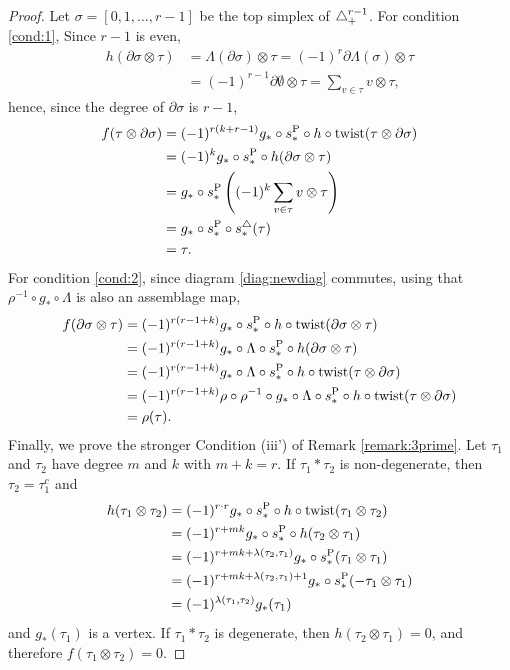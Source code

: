 \begin{proof}
	Let $\sigma = [0,1,\ldots,r-1]$ be the top simplex of $\triangle_{+}^{r-1}$. For condition \eqref{cond:1},  Since $r-1$ is even,
	\begin{align*}
		h(\partial\sigma\otimes \tau) &= \Lambda(\partial \sigma)\otimes \tau = (-1)^{r}\partial \Lambda(\sigma)\otimes\tau
		\\&= (-1)^{r-1}\partial\emptyset\otimes\tau = \sum_{v\in \tau} v\otimes\tau,
	\end{align*}
	hence, since the degree of $\partial \sigma$ is $r-1$,
	\begin{align*}
		f(\tau\otimes \partial\sigma)
		&=(-1)^{r(k+r-1)} g_*\circ s_*^{\operatorname{P}}\circ h \circ \mathrm{twist}(\tau\otimes \partial\sigma)\\
		&= (-1)^{k} g_*\circ s_*^{\operatorname{P}}\circ h (\partial\sigma\otimes \tau)\\
		&= g_*\circ s_*^{\operatorname{P}}\left((-1)^k\sum_{v\in \tau} v\otimes\tau\right) \\
		&= g_*\circ s_*^{\operatorname{P}}\circ s_*^{\triangle}(\tau) \\
		&= \tau.
	\end{align*}
	For condition \eqref{cond:2}, since diagram \eqref{diag:newdiag} commutes, using that $\rho^{-1}\circ g_*\circ \Lambda$ is also an assemblage map,
	\begin{align*}
		f(\partial\sigma\otimes \tau)
		&= (-1)^{r(r-1+k)}g_*\circ s_*^{\operatorname{P}}\circ h \circ \mathrm{twist}(\partial\sigma\otimes \tau)
		\\
		&= (-1)^{r(r-1+k)} g_*\circ \Lambda\circ s_*^{\operatorname{P}}\circ h (\partial \sigma \otimes \tau)
		\\
		&= (-1)^{r(r-1+k)} g_*\circ \Lambda\circ s_*^{\operatorname{P}}\circ h \circ \mathrm{twist}(\tau\otimes \partial\sigma)
		\\
		&= (-1)^{r(r-1+k)}\rho\circ \rho^{-1} \circ g_*\circ \Lambda\circ s_*^{\operatorname{P}}\circ h \circ \mathrm{twist}(\tau\otimes \partial\sigma)
		\\
		&= \rho(\tau).
	\end{align*}
	Finally, we prove the stronger Condition (iii') of Remark \ref{remark:3prime}. Let $\tau_1$ and $\tau_2$ have degree $m$ and $k$ with $m+k=r$. If $\tau_1*\tau_2$ is non-degenerate, then $\tau_2 = \tau_1^c$ and
	\begin{align*}
		h(\tau_1\otimes \tau_2)
		&= (-1)^{r\cdot r} g_*\circ s_*^{\operatorname{P}}\circ h\circ \operatorname{twist}(\tau_1\otimes \tau_2)
		\\
		&= (-1)^{r + mk} g_*\circ s_*^{\operatorname{P}}\circ h(\tau_2\otimes \tau_1)
		\\
		&= (-1)^{r + mk + \lambda(\tau_2,\tau_1)} g_*\circ s_*^{\operatorname{P}}(\tau_1\otimes \tau_1)
		\\
		&= (-1)^{r + mk + \lambda(\tau_2,\tau_1) + 1} g_*\circ s_*^{\operatorname{P}}(-\tau_1\otimes \tau_1)
		\\
		&= (-1)^{\lambda(\tau_1,\tau_2)} g_*(\tau_1)
	\end{align*}
	and $g_*(\tau_1)$ is a vertex. If $\tau_1*\tau_2$ is degenerate, then $h(\tau_2\otimes \tau_1) = 0$, and therefore $f(\tau_1\otimes \tau_2)=0$.
\end{proof}

